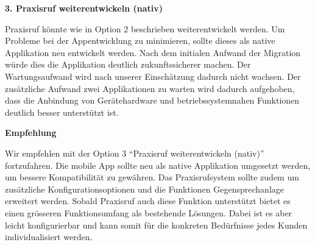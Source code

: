 \textbf{3. Praxisruf weiterentwickeln (nativ)}

Praxisruf könnte wie in Option 2 beschrieben weiterentwickelt werden.
Um Probleme bei der Appentwicklung zu minimieren, sollte dieses als native Applikation neu entwickelt werden.
Nach dem initialen Aufwand der Migration würde dies die Applikation deutlich zukunftssicherer machen.
Der Wartungsaufwand wird nach unserer Einschätzung dadurch nicht wachsen.
Der zusätzliche Aufwand zwei Applikationen zu warten wird dadurch aufgehoben, dass die Anbindung von Gerätehardware
und betriebssystemnahen Funktionen deutlich besser unterstützt ist.

\textbf{Empfehlung}

Wir empfehlen mit der Option 3 ``Praxisruf weiterentwickeln (nativ)'' fortzufahren.
Die mobile App sollte neu als native Applikation umgesetzt werden, um bessere Kompatibilität zu gewähren.
Das Praxisrufsystem sollte zudem um zusätzliche Konfigurationsoptionen und die Funktionen Gegensprechanlage erweitert werden.
Sobald Praxisruf auch diese Funktion unterstützt bietet es einen grösseren Funktionsumfang als bestehende Lösungen.
Dabei ist es aber leicht konfigurierbar und kann somit für die konkreten Bedürfnisse jedes Kunden individualisiert werden.

\clearpage
